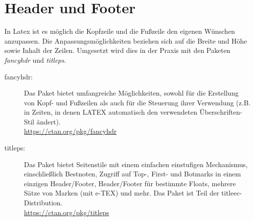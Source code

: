 \chapter{Header und Footer}
In Latex ist es möglich die Kopfzeile und die Fußzeile den eigenen Wünschen anzupassen. Die Anpassungsmöglichkeiten beziehen sich auf die Breite und Höhe sowie Inhalt der Zeilen. Umgesetzt wird dies in der Praxis mit den Paketen \emph{fancyhdr} und \emph{titleps}. 

\begin{description}
	\item[fancyhdr:] Das Paket bietet umfangreiche Möglichkeiten, sowohl für die Erstellung von Kopf- und Fußzeilen als auch für die Steuerung ihrer Verwendung (z.B. in Zeiten, in denen LATEX automatisch den verwendeten Überschriften-Stil ändert).\\
	\url{https://ctan.org/pkg/fancyhdr}
	\item[titleps:] Das Paket bietet Seitenstile mit einem einfachen einstufigen Mechanismus, einschließlich Bestnoten, Zugriff auf Top-, First- und Botmarks in einem einzigen Header/Footer, Header/Footer für bestimmte Floats, mehrere Sätze von Marken (mit e-TEX) und mehr.
	Das Paket ist Teil der titleec-Distribution.\\
	\url{https://ctan.org/pkg/titleps}
\end{description}

